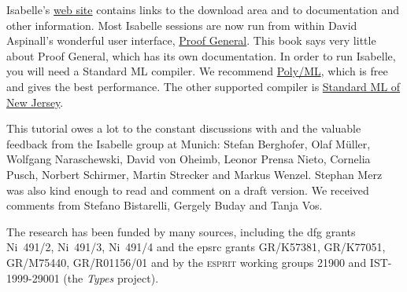 Isabelle's
\href{http://www.cl.cam.ac.uk/Research/HVG/Isabelle/}{web site}
contains links to the download area and to documentation and other
information.  Most Isabelle sessions are now run from within David
Aspinall's wonderful user interface,
\href{http://www.proofgeneral.org/}{Proof General}.  This book says
very little about Proof General, which has its own documentation.  In
order to run Isabelle, you will need a Standard ML compiler.  We
recommend \href{http://www.polyml.org/}{Poly/ML}, which is free and
gives the best performance.  The other supported compiler is
\href{http://cm.bell-labs.com/cm/cs/what/smlnj/index.html}{Standard
ML of New Jersey}.

This tutorial owes a lot to the constant discussions with and the valuable
feedback from the Isabelle group at Munich: Stefan Berghofer, Olaf
M{\"u}ller, Wolfgang Naraschewski, David von Oheimb, Leonor Prensa Nieto,
Cornelia Pusch, Norbert Schirmer, Martin Strecker and Markus Wenzel. Stephan
Merz was also kind enough to read and comment on a draft version.  We
received comments from Stefano Bistarelli, Gergely Buday and Tanja
Vos.

The research has been funded by many sources, including the {\sc dfg} grants
Ni~491/2, Ni~491/3, Ni~491/4 and the {\sc epsrc} grants GR\slash K57381,
GR\slash K77051, GR\slash M75440, GR\slash R01156\slash 01 and by the
\textsc{esprit} working groups 21900 and IST-1999-29001 (the \emph{Types}
project).
